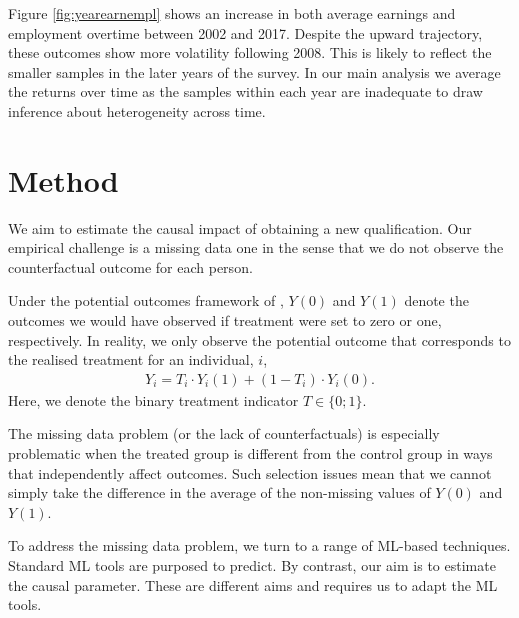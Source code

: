 \documentclass[12pt, a4paper]{article}
\begin{document}
Figure \ref{fig:yearearnempl} shows an increase in both average earnings and employment overtime between 2002 and 2017. Despite the upward trajectory, these outcomes show more volatility following 2008. This is likely to reflect the smaller samples in the later years of the survey. In our main analysis we average the returns over time as the samples within each year are inadequate to draw inference about heterogeneity across time.




\section{Method}

We aim to estimate the causal impact of obtaining a new qualification. Our empirical challenge is a missing data one in the sense that we do not observe the counterfactual outcome for each person.

Under the potential outcomes framework of \cite{imbens2015}, $Y(0)$ and $Y(1)$ denote the outcomes we would have observed if treatment were set to zero or one, respectively. In reality, we only observe the potential outcome that corresponds to the realised treatment for an individual, $i$,
\begin{align}
Y_i=T_i \cdot Y_i(1) + (1-T_i) \cdot Y_i(0).
\end{align}
Here, we denote the binary treatment indicator $T \in \{0;1\}$.

The missing data problem (or the lack of counterfactuals) is especially problematic when the treated group is different from the control group in ways that independently affect outcomes. Such selection issues mean that we cannot simply take the difference in the average of the non-missing values of $Y(0)$ and $Y(1)$.

To address the missing data problem, we turn to a range of ML-based techniques. Standard ML tools are purposed to predict. By contrast, our aim is to estimate the causal parameter. These are different aims and requires us to adapt the ML tools. 
\end{document}
